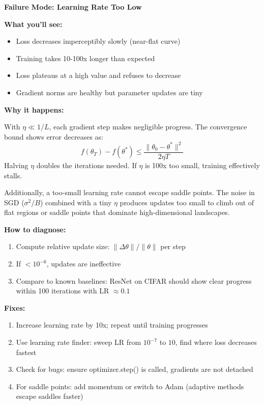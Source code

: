 \documentclass[../../main.tex]{subfiles}
\begin{document}
\begin{whatbreaks}
\textbf{Failure Mode: Learning Rate Too Low}

\textbf{What you'll see:}
\begin{itemize}
    \item Loss decreases imperceptibly slowly (near-flat curve)
    \item Training takes 10-100x longer than expected
    \item Loss plateaus at a high value and refuses to decrease
    \item Gradient norms are healthy but parameter updates are tiny
\end{itemize}

\textbf{Why it happens:}

With $\eta \ll 1/L$, each gradient step makes negligible progress. The convergence bound shows error decreases as:
\[
    f(\theta_T) - f(\theta^*) \leq \frac{\|\theta_0 - \theta^*\|^2}{2\eta T}
\]
Halving $\eta$ doubles the iterations needed. If $\eta$ is 100x too small, training effectively stalls.

Additionally, a too-small learning rate cannot escape saddle points. The noise in SGD ($\sigma^2/B$) combined with a tiny $\eta$ produces updates too small to climb out of flat regions or saddle points that dominate high-dimensional landscapes.

\textbf{How to diagnose:}
\begin{enumerate}
    \item Compute relative update size: $\|\Delta\theta\|/\|\theta\|$ per step
    \item If $< 10^{-6}$, updates are ineffective
    \item Compare to known baselines: ResNet on CIFAR should show clear progress within 100 iterations with LR $\approx 0.1$
\end{enumerate}

\textbf{Fixes:}
\begin{enumerate}
    \item Increase learning rate by 10x; repeat until training progresses
    \item Use learning rate finder: sweep LR from $10^{-7}$ to $10$, find where loss decreases fastest
    \item Check for bugs: ensure optimizer.step() is called, gradients are not detached
    \item For saddle points: add momentum or switch to Adam (adaptive methods escape saddles faster)
\end{enumerate}
\end{whatbreaks}
\end{document}
